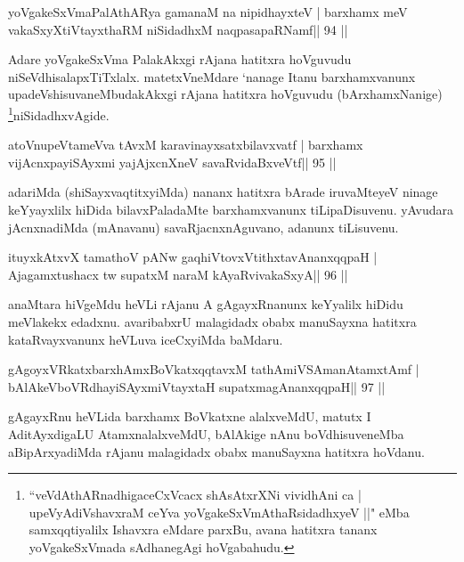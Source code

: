 \begin{shl}
yoVgakeSxVmaPalAthARya gamanaM na nipidhayxteV |
barxhamx meV vakaSxyXtiVtayxthaRM niSidadhxM naqpasapaRNamf\hfill || 94 ||
\end{shl}

\begin{artha}
Adare yoVgakeSxVma PalakAkxgi rAjana hatitxra hoVguvudu 
niSeVdhisalapxTiTxlalx. matetxVneMdare `nanage Itanu barxhamxvanunx 
upadeVshisuvaneMbudakAkxgi rAjana hatitxra hoVguvudu (bArxhamxNanige) 
\footnote[11]{``veVdAthARnadhigaceCxVcacx shAsAtxrXNi vividhAni ca | 
upeVyAdiVshavxraM ceYva yoVgakeSxVmAthaRsidadhxyeV ||" eMba samxqqtiyalilx Ishavxra eMdare parxBu, avana hatitxra tananx yoVgakeSxVmada sAdhanegAgi hoVgabahudu.}niSidadhxvAgide.
\end{artha}

\begin{shl}
atoV\s nupeVtameVva tAvxM karavinayxsatxbilavxvatf |
barxhamx vijAcnxpayiSAyxmi yajAjxcnXneV savaRvidaBxveVtf\hfill || 95 ||
\end{shl}

\begin{artha}
adariMda (shiSayxvaqtitxyiMda) nananx hatitxra bArade iruvaMteyeV  ninage keYyayxlilx hiDida bilavxPaladaMte barxhamxvanunx  tiLipaDisuvenu. yAvudara jAcnxnadiMda (mAnavanu) savaRjacnxnAguvano, adanunx tiLisuvenu.
\end{artha}

\begin{shl}
ituyxkAtxvX tamathoV pANw gaqhiVtovxVtithxtavAnanxqqpaH |
Ajagamxtushacx tw supatxM naraM kAyaRvivakaSxyA\hfill || 96 ||
\end{shl}

\begin{artha}
anaMtara hiVgeMdu heVLi rAjanu A gAgayxRnanunx keYyalilx hiDidu meVlakekx edadxnu. avaribabxrU malagidadx obabx manuSayxna hatitxra kataRvayxvanunx heVLuva iceCxyiMda baMdaru.
\end{artha} 
 


\begin{shl}
gAgoyxVRkatxbarxhAmxBoVkatxqqtavxM tathA\s miVSAmanAtamxtAmf |
bAlAkeVboVRdhayiSAyxmiVtayxtaH supatxmagAnanxqqpaH\hfill || 97 ||
\end{shl}

\begin{artha}
gAgayxRnu heVLida barxhamx BoVkatxne alalxveMdU, matutx I AditAyxdigaLU AtamxnalalxveMdU, bAlAkige nAnu boVdhisuveneMba aBipArxyadiMda rAjanu malagidadx obabx manuSayxna hatitxra hoVdanu.
\end{artha}
 
